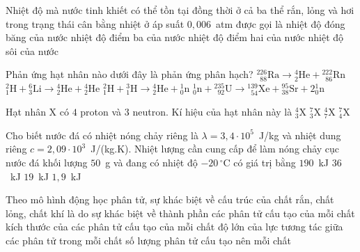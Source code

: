 	\begin{ex}%
		Nhiệt độ mà nước tinh khiết có thể tồn tại đồng thời ở cả ba thể rắn, lỏng và hơi trong trạng thái cân bằng nhiệt ở áp suất $0{,}006$~atm được gọi là
		\choice
		{nhiệt độ đóng băng của nước}
		{\True nhiệt độ điểm ba của nước}
		{nhiệt độ điểm hai của nước}
		{nhiệt độ sôi của nước}
	\end{ex}

	\begin{ex}%
		Phản ứng hạt nhân nào dưới đây là phản ứng phân hạch?
		\choice
		{${}^{226}_{\phantom{2}88}\text{Ra}\to{}^4_2\text{He}+{}^{222}_{\phantom{2}86}\text{Rn}$}
		{${}^2_1\text{H}+{}^6_3\text{Li}\to{}^4_2\text{He}+{}^4_2\text{He}$}
		{${}^2_1\text{H}+{}^3_1\text{H}\to{}^4_2\text{He}+{}^1_0\text{n}$}
		{\True ${}^1_0\text{n}+{}^{235}_{\phantom{2}92}\text{U}\to{}^{139}_{\phantom{1}54}\text{Xe}+{}^{95}_{38}\text{Sr}+2{}^1_0\text{n}$}
	\end{ex}

	\begin{ex}%
		Hạt nhân X có $4$ proton và $3$ neutron. Kí hiệu của hạt nhân này là
		\choice
		{${}^4_3\text{X}$}
		{${}^7_3\text{X}$}
		{${}^4_7\text{X}$}
		{\True ${}^7_4\text{X}$}
	\end{ex}

	\begin{ex}%
		Cho biết nước đá có nhiệt nóng chảy riêng là $\lambda=3{,}4\cdot 10^5$~J/kg và nhiệt dung riêng $c=2{,}09\cdot 10^3$~J/(kg.K). Nhiệt lượng cần cung cấp để làm nóng chảy cục nước đá khối lượng $50$~g và đang có nhiệt độ $-20\,^\circ\text{C}$ có giá trị bằng
		\choice
		{$190$~kJ}
		{$36$~kJ}
		{\True $19$~kJ}
		{$1{,}9$~kJ}
	\end{ex}

	\begin{ex}%
		Theo mô hình động học phân tử, sự khác biệt về cấu trúc của chất rắn, chất lỏng, chất khí là do sự khác biệt về
		\choice
		{thành phần các phân tử cấu tạo của mỗi chất}
		{kích thước của các phân tử cấu tạo của mỗi chất}
		{\True độ lớn của lực tương tác giữa các phân tử trong mỗi chất}
		{số lượng phân tử cấu tạo nên mỗi chất}
	\end{ex}

